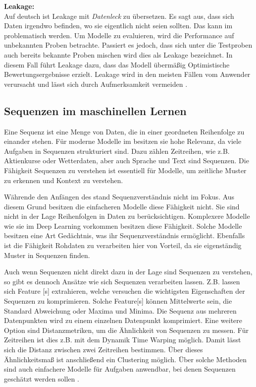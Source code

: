 \textbf{\gls{Leakage}:}\\
Auf deutsch ist \gls{Leakage} mit \textit{Datenleck} zu übersetzen. Es sagt aus, dass sich Daten irgendwo befinden, wo sie eigentlich nicht seien sollten. Das kann im  problematisch werden. Um Modelle zu evaluieren, wird die Performance auf unbekannten Proben betrachte. Passiert es jedoch, dass sich unter die Testproben auch bereits bekannte Proben mischen wird dies als \gls{Leakage} bezeichnet. In diesem Fall führt \gls{Leakage} dazu, dass das Modell übermäßig Optimistische Bewertungsergebnisse erzielt. \gls{Leakage} wird in den meisten Fällen vom Anwender verursacht und lässt sich durch Aufmerksamkeit vermeiden \cite{Zheng.2015}.


\subsection{Sequenzen im maschinellen Lernen} \label{sec:sequenzen ML}
Eine Sequenz ist eine Menge von Daten, die in einer geordneten Reihenfolge zu einander stehen. Für moderne Modelle im  besitzen sie hohe Relevanz, da viele Aufgaben in Sequenzen strukturiert sind. Dazu zählen Zeitreihen, wie z.B. Aktienkurse oder Wetterdaten, aber auch Sprache und Text sind Sequenzen. Die Fähigkeit Sequenzen zu verstehen ist essentiell für Modelle, um zeitliche Muster zu erkennen und Kontext zu verstehen. \par

Währende den Anfängen des  stand Sequenzverständnis nicht im Fokus. Aus diesem Grund besitzen die einfacheren Modelle diese Fähigkeit nicht. Sie sind nicht in der Lage Reihenfolgen in Daten zu berücksichtigen. Komplexere Modelle wie sie im \gls{Deep Learning} vorkommen besitzen diese Fähigkeit. Solche Modelle besitzen eine Art Gedächtnis, was ihr Sequenzverständnis ermöglicht. Ebenfalls ist die Fähigkeit Rohdaten zu verarbeiten hier von Vorteil, da sie eigenständig Muster in Sequenzen finden.\par

Auch wenn Sequenzen nicht direkt dazu in der Lage sind Sequenzen zu verstehen, so gibt es dennoch Ansätze wie sich Sequenzen verarbeiten lassen. Z.B. lassen sich \gls{Feature} [s] extrahieren, welche versuchen die wichtigsten Eigenschaften der Sequenzen zu komprimieren. Solche \gls{Feature}[s] können Mittelwerte sein, die Standard Abweichung oder Maxima und Minima. Die Sequenz aus mehreren Datenpunkten wird zu einem einzelnen Datenpunkt komprimiert. Eine weitere Option sind Distanzmetriken, um die Ähnlichkeit von Sequenzen zu messen. Für Zeitreihen ist dies z.B. mit dem Dynamik Time Warping möglich. Damit lässt sich die Distanz zwischen zwei Zeitreihen bestimmen. Über dieses Ähnlichkeitsmaß ist anschließend ein Clustering möglich. Über solche Methoden sind auch einfachere Modelle für Aufgaben anwendbar, bei denen Sequenzen geschätzt werden sollen \cite{Nielsen.2020}.